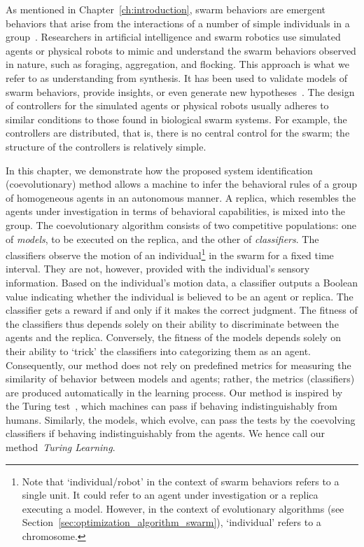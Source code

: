 As mentioned in Chapter~\ref{ch:introduction}, swarm behaviors are emergent behaviors that arise from the interactions of a number of simple individuals in a group~\cite{Camazine2001}. Researchers in artificial intelligence and swarm robotics use simulated agents or physical robots to mimic and understand the swarm behaviors observed in nature, such as foraging, aggregation, and flocking. This approach is what we refer to as understanding from synthesis. It has been used to validate models of swarm behaviors, provide insights, or even generate new hypotheses~\cite{J.Halloy2007}. The design of controllers for the simulated agents or physical robots usually adheres to similar conditions to those found in biological swarm systems.
For example, the controllers are distributed, that is, there is no central control for the swarm; the structure of the controllers is relatively simple.

In this chapter, we demonstrate how the proposed system identification (coevolutionary) method allows a machine to infer the behavioral rules of a group of homogeneous agents in an autonomous manner. A replica, which resembles the agents under investigation in terms of behavioral capabilities, is mixed into the group. The coevolutionary algorithm consists of two competitive populations: one of \textit{models}, to be executed on the replica, and the other of \textit{classifiers}. The classifiers observe the motion of an individual\footnote{Note that `individual/robot' in the context of swarm behaviors refers to a single unit. It could refer to an agent under investigation or a replica executing a model. However, in the context of evolutionary algorithms (see Section~\ref{sec:optimization_algorithm_swarm}), `individual' refers to a chromosome.} in the swarm for a fixed time interval. They are not, however, provided with the individual's sensory information. Based on the individual's motion data, a classifier outputs a Boolean value indicating whether the individual is believed to be an agent or replica. The classifier gets a reward if and only if it makes the correct judgment. The fitness of the classifiers thus depends solely on their ability to discriminate between the agents and the replica. Conversely, the fitness of the models depends solely on their ability to `trick' the classifiers into categorizing them as an agent. Consequently, our method does not rely on predefined metrics for measuring the similarity of behavior between models and agents; rather, the metrics (classifiers) are produced automatically in the learning process. Our method is inspired by the Turing test~\cite{Turing1950, Harnad2000}, which machines can pass if behaving indistinguishably from humans. Similarly, the models, which evolve, can pass the tests by the coevolving classifiers if behaving indistinguishably from the agents. We hence call our method~\textit{Turing Learning}.

